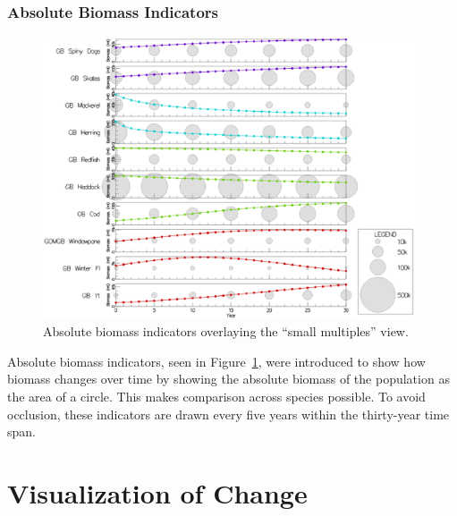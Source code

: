 \subsubsection{Absolute Biomass Indicators}

\begin{figure}[h]
	\centering
	\includegraphics[width=11cm]{figures/eps/msprod_abssize.eps}
	\caption{Absolute biomass indicators overlaying the ``small multiples'' view.}
	\label{fig:msprod_abssize}
\end{figure}

Absolute biomass indicators, seen in Figure~\ref{fig:msprod_abssize}, were introduced to show how biomass changes over time by showing the absolute biomass of the population as the area of a circle.  This makes comparison across species possible.  To avoid occlusion, these indicators are drawn every five years within the thirty-year time span.

\section{Visualization of Change}

